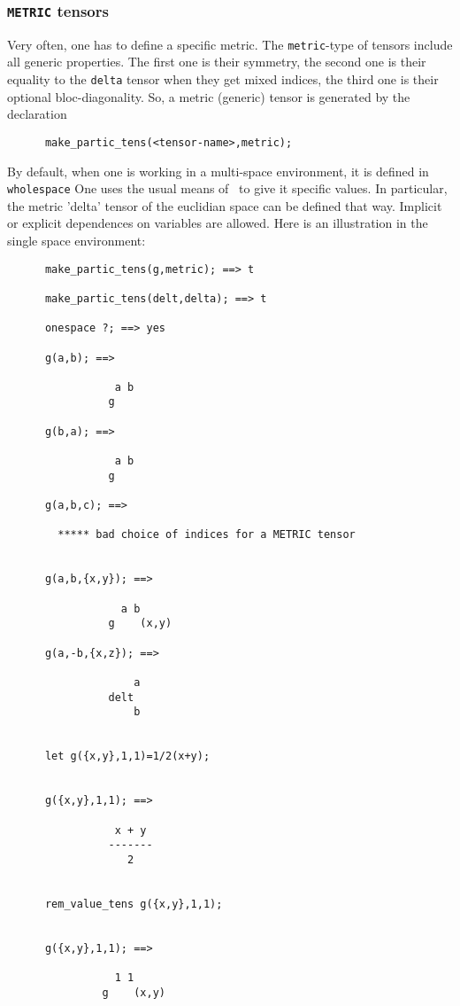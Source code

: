 \subsubsection{\texttt{METRIC} tensors}
Very often, one has to define a specific metric. The \texttt{metric}-type
of tensors include all generic properties. The first one is their symmetry,
the second one is their equality to the \texttt{delta}  tensor
when they get mixed indices, the third one is their optional bloc-diagonality.
So, a metric (generic) tensor is generated by the declaration
\begin{verbatim}
      make_partic_tens(<tensor-name>,metric);
\end{verbatim} 
By default, when one is working in a multi-space environment, it is
defined in  \texttt{wholespace}
One uses the usual means of \REDUCE\ to give it specific values.
In particular, the metric 'delta' tensor of the euclidian space
can be defined that way.
Implicit or explicit dependences on variables are allowed.
Here is an illustration in the single space environment:
\begin{verbatim}
      make_partic_tens(g,metric); ==> t

      make_partic_tens(delt,delta); ==> t

      onespace ?; ==> yes

      g(a,b); ==>

                 a b
                g

      g(b,a); ==>

                 a b
                g

      g(a,b,c); ==>

        ***** bad choice of indices for a METRIC tensor


      g(a,b,{x,y}); ==>

                  a b
                g    (x,y)

      g(a,-b,{x,z}); ==>

                    a
                delt
                    b


      let g({x,y},1,1)=1/2(x+y);


      g({x,y},1,1); ==>

                 x + y
                -------
                   2


      rem_value_tens g({x,y},1,1);


      g({x,y},1,1); ==>

                 1 1
               g    (x,y)
\end{verbatim}

